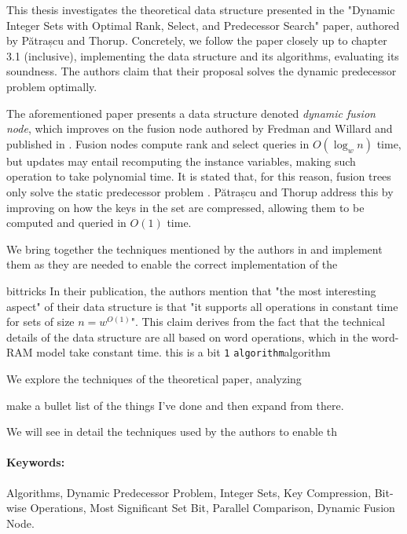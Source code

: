 

This thesis investigates the theoretical data structure presented in the "Dynamic Integer Sets with Optimal Rank, Select, and Predecessor Search" paper, authored by Pătrașcu and Thorup. Concretely, we follow the paper closely up to chapter 3.1 (inclusive), implementing the data structure and its algorithms, evaluating its soundness. The authors claim that their proposal solves the dynamic predecessor problem optimally.

The aforementioned paper presents a data structure denoted \textit{dynamic fusion node}, which improves on the fusion node authored by Fredman and Willard and published in \cite{fredman1993surpassing}.
Fusion nodes compute rank and select queries in $O(\log_w n)$ time, but updates may entail recomputing the instance variables, making such operation to take polynomial time. It is stated that, for this reason, fusion trees only solve the static predecessor problem \cite{nelsonjelanilec2}. Pătrașcu and Thorup address this by improving on how the keys in the set are compressed, allowing them to be computed and queried in $O(1)$ time.




We bring together the techniques mentioned by the authors in \cite{patrascu2014dynamic} and implement them as they are needed to enable the correct implementation of the 

bittricks
In their publication, the authors mention that "the most interesting aspect" of their data structure is that "it supports all operations in constant time for sets of size $n = w^{O(1)}$". This claim derives from the fact that the technical details of the data structure are all based on word operations, which in the word-RAM model take constant time. this is a bit \texttt{1}{} \texttt{algorithm}{\ttfamily algorithm}

We explore the techniques of the theoretical paper, analyzing 

make a bullet list of the things I've done and then expand from there.

We will see in detail the techniques used by the authors to enable th

\paragraph*{Keywords:} Algorithms, Dynamic Predecessor Problem, Integer Sets, Key Compression, Bit-wise Operations, Most Significant Set Bit, Parallel Comparison, Dynamic Fusion Node.

